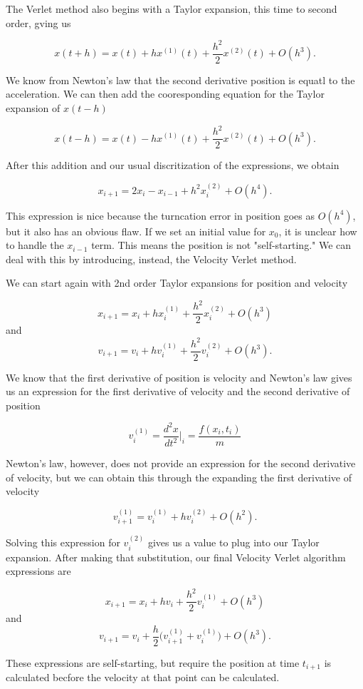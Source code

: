 \documentclass[%
oneside,                 %
final,                   %
10pt]{article}
\begin{document}
The Verlet method also begins with a Taylor expansion, this time to second order, gving us

\[
x(t+h) = x(t)+hx^{(1)}(t)+\frac{h^2}{2}x^{(2)}(t) + O(h^3).
\]

We know from Newton's law that the second derivative position is equatl to the acceleration.  We can then add the cooresponding equation for the Taylor expansion of $x(t-h)$

\[
x(t-h) = x(t)-hx^{(1)}(t)+\frac{h^2}{2}x^{(2)}(t) + O(h^3).
\]

After this addition and our usual discritization of the expressions, we obtain

\[
x_{i+1}=2x_i -x_{i-1}+h^2x_i^{(2)}+O(h^4).
\]

This expression is nice because the turncation error in position goes as $O(h^4)$, but it also has an obvious flaw.  If we set an initial value for $x_0$, it is unclear how to handle the $x_{i-1}$ term.  This means the position is not "self-starting."  We can deal with this by introducing, instead, the Velocity Verlet method.

We can start again with 2nd order Taylor expansions for position and velocity

\[
x_{i+1} =x_i +hx_i^{(1)}+\frac{h^2}{2}x_i^{(2)}+O(h^3)
\]
and
\[
v_{i+1} =v_i +hv_i^{(1)}+\frac{h^2}{2}v_i^{(2)}+O(h^3).
\]

We know that the first derivative of position is velocity and Newton's law gives us an expression for the first derivative of velocity and the second derivative of position

\[
v_i^{(1)}=\frac{d^2x}{dt^2}|_i=\frac{f(x_i,t_i)}{m}
\]

Newton's law, however, does not provide an expression for the second derivative of velocity, but we can obtain this through the expanding the first derivative of velocity

\[
v_{i+1}^{(1)}=v_i^{(1)} + hv_i^{(2)}+O(h^2).
\]

Solving this expression for $v_i^{(2)}$ gives us a value to plug into our Taylor expansion.  After making that substitution, our final Velocity Verlet algorithm expressions are

\[
x_{i+1} =x_i +hv_i+\frac{h^2}{2}v_i^{(1)}+O(h^3)
\]
and
\[
v_{i+1} =v_i +\frac{h}{2} \big(v_{i+1}^{(1)}+v_i^{(1)} \big)+O(h^3).
\]

These expressions are self-starting, but require the position at time $t_{i+1}$ is calculated becfore the velocity at that point can be calculated.
\end{document}
